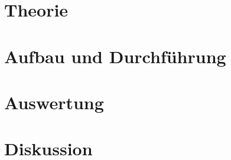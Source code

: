 

\setlength{\parindent}{0em}


%
%

\tableofcontents
\newpage

%

\section{Theorie}

\newpage

\section{Aufbau und Durchführung}

\newpage
\FloatBarrier

\section{Auswertung}

\newpage
\FloatBarrier

\section{Diskussion}


